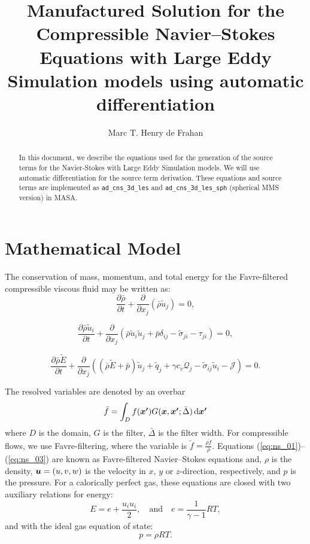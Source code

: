 \documentclass[10pt]{article}
\title{Manufactured Solution for the Compressible Navier--Stokes Equations with Large Eddy Simulation models using automatic differentiation}
\author{Marc T. Henry de Frahan}
\newcommand{\bv}[1]{\ensuremath{\mbox{\boldmath$ #1 $}}}
\newcommand{\pfrac}[2]{\frac{\partial#1}{\partial#2}}
\newcommand{\wt}[1]{\widetilde{#1}}
\newcommand{\ud}{\,\mathrm{d}}
\begin{document}
\maketitle

\begin{abstract}
  In this document, we describe the equations used for the generation
  of the source terms for the Navier-Stokes with Large Eddy Simulation
  models. We will use automatic differentiation for the source term
  derivation. These equations and source terms are implemented as
  \texttt{ad\_cns\_3d\_les} and \texttt{ad\_cns\_3d\_les\_sph}
  (spherical MMS version) in MASA.
\end{abstract}

\section{Mathematical Model}
The conservation of mass, momentum, and total energy for the Favre-filtered compressible viscous fluid may be written as:
\begin{equation}
  \label{eq:ns_01}
  \pfrac{\bar{\rho}}{t} + \pfrac{}{x_j}\left( \bar{\rho} \wt{u}_j \right) = 0,
\end{equation}

\begin{equation}
  \label{eq:ns_02}
  \pfrac{\bar{\rho} \wt{u}_i}{t} + \pfrac{}{x_j}\left( \bar{\rho} \wt{u}_i \wt{u}_j + \bar{p} \delta_{ij} - \wt{\sigma}_{ji} - \tau_{ji} \right) = 0,
\end{equation}

\begin{equation}
  \label{eq:ns_03}
  \pfrac{\bar{\rho} \wt{E}}{t} + \pfrac{}{x_j}\left( \left(\bar{\rho} \wt{E} + \bar{p}\right) \wt{u}_j + \wt{q}_j + \gamma c_v \mathcal{Q}_j - \wt{\sigma}_{ij} \wt{u}_i - \mathcal{J} \right) = 0.
\end{equation}

The resolved variables are denoted by an overbar
\begin{equation}
  \bar{f} = \int_D f(\bv{x'}) G(\bv{x}, \bv{x'}; \bar{\Delta}) \ud \bv{x'}
\end{equation}
where $D$ is the domain, $G$ is the filter, $\bar{\Delta}$ is the
filter width. For compressible flows, we use Favre-filtering, where
the variable is $\wt{f} = \frac{\overline{\rho f}}{\bar{\rho}}$.
Equations (\ref{eq:ns_01})--(\ref{eq:ns_03}) are known as
Favre-filtered Navier--Stokes equations and, $\rho$ is the density,
$\bv{u}=(u,v,w)$ is the velocity in $x$, $y$ or $z$-direction,
respectively, and $p$ is the pressure. For a calorically perfect gas,
these equations are closed with two auxiliary relations for energy:
\begin{equation}
  \label{eq:ns_04}
  E = e + \dfrac{u_i u_i}{2},\quad\mbox{and}\quad e=\dfrac{1}{\gamma -1}RT ,
\end{equation}
and with the ideal gas equation of state:
\begin{equation}
  \label{eq:ns_05}
  p=\rho RT.
\end{equation}
\end{document}

